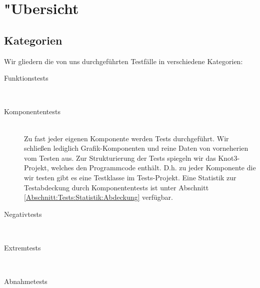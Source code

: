 %



\section{{"U}bersicht}
\label{Abschnitt:Tests:Uebersicht}



\subsection{Kategorien}
\label{Abschnitt:Tests:Uebersicht:Kategorien}

Wir gliedern die von uns durchgeführten Testfälle in verschiedene Kategorien:\\


\begin{description} %


	\item[Funktionstests] \hfill
	\\
	
	
	\item[Komponententests] \hfill
	\\
	
	Zu fast jeder eigenen Komponente werden Tests durchgeführt. Wir schließen lediglich Grafik-Komponenten und reine Daten von vorneherien vom Testen aus. Zur Strukturierung der Tests spiegeln wir das Knot3-Projekt, welches den Programmcode enthält. D.h. zu jeder Komponente die wir testen gibt es eine Testklasse im Tests-Projekt. Eine Statistik zur Testabdeckung durch Komponententests ist unter Abschnitt \ref{Abschnitt:Tests:Statistik:Abdeckung} verfügbar.\\


	\item[Negativtests] \hfill
	\\

	
	\item[Extremtests] \hfill
	\\


	\item[Abnahmetests] \hfill
	\\
		
\end{description}










